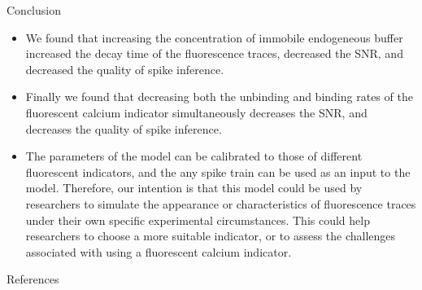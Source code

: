 \documentclass[final]{beamer}
\newlength{\onecolwid}
\begin{document}
\begin{frame}[t]
\begin{columns}[t]
\begin{column}{\onecolwid}
\begin{block}{Conclusion}
\begin{itemize}
	\item We found that increasing the concentration of immobile endogeneous buffer increased the decay time of the fluorescence traces, decreased the SNR, and decreased the quality of spike inference.

	\item Finally we found that decreasing both the unbinding and binding rates of the fluorescent calcium indicator simultaneously decreases the SNR, and decreases the quality of spike inference.

	\item The parameters of the model can be calibrated to those of different fluorescent indicators, and the any spike train can be used as an input to the model. Therefore, our intention is that this model could be used by researchers to simulate the appearance or characteristics of fluorescence traces under their own specific experimental circumstances. This could help researchers to choose a more suitable indicator, or to assess the challenges associated with using a fluorescent calcium indicator.
\end{itemize}
\end{block}


%
%
%


\begin{block}{References}

\nocite{*} %
\small{
}

\end{block}




\end{column}
\end{columns}
\end{frame}
\end{document}
